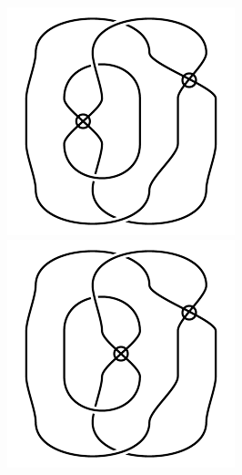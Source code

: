 \begin{figure}[H]
\begin{minipage}[b]{.18\linewidth}
\centering
\includegraphics[width=\linewidth]{../data/virtual_4_7.png}
\end{minipage}
\begin{minipage}[b]{.18\linewidth}
\centering
\includegraphics[width=\linewidth]{../data/virtual_4_8.png}

\end{minipage}
\end{figure}
